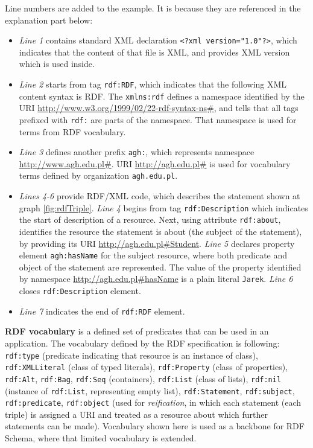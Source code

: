 \noindent Line numbers are added to the example. It is because they are referenced in the explanation part below:
\begin{itemize}
    \setlength{\itemsep}{0cm}
    \setlength{\parskip}{0cm}

    \item \textit{Line 1} contains standard XML declaration \texttt{<?xml version="1.0"?>}, which indicates that the content of that file is XML, and provides XML version which is used inside.	
    \item \textit{Line 2} starts from tag \texttt{rdf:RDF}, which indicates that the following XML content syntax is RDF. The \texttt{xmlns:rdf} defines a namespace identified by the URI \url{http://www.w3.org/1999/02/22-rdf-syntax-ns#}, and tells that all tags prefixed with \texttt{rdf:} are parts of the namespace. That namespace is used for terms from RDF vocabulary.
    \item \textit{Line 3} defines another prefix \texttt{agh:}, which represents namespace \url{http://www.agh.edu.pl#}. URI \url{http://agh.edu.pl#} is used for vocabulary terms defined by organization \texttt{agh.edu.pl}.
    \item \textit{Lines 4-6} provide RDF/XML code, which describes the statement shown at graph \ref{fig:rdfTriple}. \textit{Line 4} begins from tag \texttt{rdf:Description} which indicates the start of description of a resource. Next, using attribute \texttt{rdf:about}, identifies the resource the statement is about (the subject of the statement), by providing its URI \url{http://agh.edu.pl#Student}. \textit{Line 5} declares property element \texttt{agh:hasName} for the subject resource, where both predicate and object of the statement are represented. The value of the property identified by namespace \url{http://agh.edu.pl#hasName} is a plain literal \texttt{Jarek}. \textit{Line 6} closes \texttt{rdf:Description} element.
    \item \textit{Line 7} indicates the end of \texttt{rdf:RDF} element.
\end{itemize}

\newpage

\noindent \textbf{RDF vocabulary} is a defined set of predicates that can be used in an application. The vocabulary defined by the RDF specification is following: \texttt{rdf:type} (predicate indicating that resource is an instance of class), \texttt{rdf:XMLLiteral} (class of typed literals), \texttt{rdf:Property} (class of properties), \texttt{rdf:Alt}, \texttt{rdf:Bag}, \texttt{rdf:Seq} (containers), \texttt{rdf:List} (class of lists), \texttt{rdf:nil} (instance of \texttt{rdf:List}, representing empty list), \texttt{rdf:Statement}, \texttt{rdf:subject}, \texttt{rdf:predicate}, \texttt{rdf:object} (used for \textit{reification}, in which each statement (each triple) is assigned a URI and treated as a resource about which further statements can be made). Vocabulary shown here is used as a backbone for RDF Schema, where that limited vocabulary is extended.

